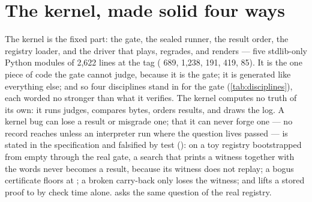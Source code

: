 
\section{The kernel, made solid four ways}
\label{sec:kernel}

The kernel is the fixed part: the gate, the sealed runner, the result
order, the registry loader, and the driver that plays, regrades, and
renders --- five stdlib-only Python modules of 2,622 lines at the tag
( 689,  1,238,  191,
 419,  85).
It is the one piece of code the gate cannot judge, because it is the
gate; it is generated like everything else; and so four disciplines
stand in for the gate (\cref{tab:disciplines}), each worded no
stronger than what it verifies. The kernel computes no truth of its
own: it runs judges, compares bytes, orders results, and draws the
log. A kernel bug can lose a result or misgrade one; that it can
never forge one --- no record reaches  unless an
interpreter run where the question lives passed --- is stated in the
specification and falsified by test (): on a toy
registry bootstrapped from empty through the real gate, a search that
prints a witness together with the words 
never becomes a result, because its witness does not replay; a bogus
certificate floors at ; a broken carry-back only loses
the witness; and  lifts a stored proof to
 by check time alone.
 asks the same question of the real registry.

